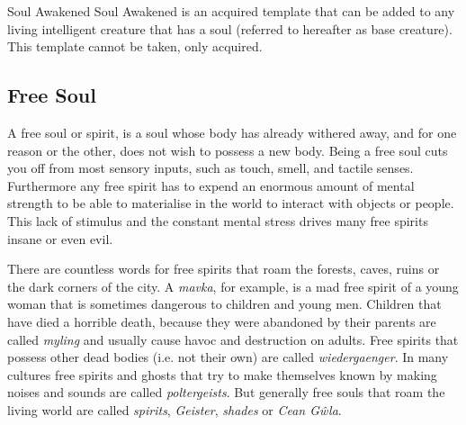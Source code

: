 \begin{35e}{Soul Awakened}
Soul Awakened is an acquired template that can be added to any living
intelligent creature that has a soul (referred to hereafter as base
creature). This template cannot be taken, only acquired.
\end{35e}

\subsection{Free Soul}
\label{sec:Free Soul}

A free soul or spirit, is a soul whose body has already withered away, and for
one reason or the other, does not wish to possess a new body. Being a free
soul cuts you off from most sensory inputs, such as touch, smell, and tactile
senses. Furthermore any free spirit has to expend an enormous amount of mental
strength to be able to materialise in the world to interact with objects or
people. This lack of stimulus and the constant mental stress drives many free
spirits insane or even evil.

There are countless words for free spirits that roam the forests, caves, ruins
or the dark corners of the city. A \emph{mavka}, for example, is a mad free
spirit of a young woman that is sometimes dangerous to children and young men.
Children that have died a horrible death, because they were abandoned by their
parents are called \emph{myling} and usually cause havoc and destruction on
adults. Free spirits that possess other dead bodies (i.e. not their own) are
called \emph{wiedergaenger}. In many cultures free spirits and ghosts that try
to make themselves known by making noises and sounds are called
\emph{poltergeists}. But generally free souls that roam the living world are
called \emph{spirits}, \emph{Geister}, \emph{shades} or \emph{Cean Gŵla}.

